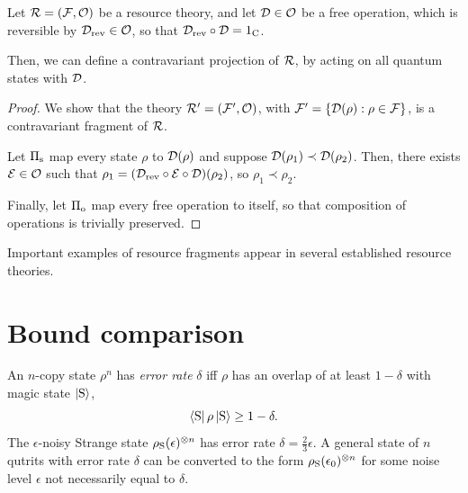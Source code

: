 \documentclass[pra,
aps,
twocolumn,
superscriptaddress,
groupedaddress,
nofootinbib,
reprint
]{revtex4-1}
\begin{document}
\begin{proposition}
	Let $\mathcal{R} = (\mathcal{F},\mathcal{O})$ be a resource theory, and let $\mathcal{D} \in \mathcal{O}$ be a free operation, which is reversible by $\mathcal{D}_{\rm{rev}} \in \mathcal{O}$, so that $\mathcal{D}_{\rm{rev}} \circ \mathcal{D} = 1_{\rm{C}}$.
	
	Then, we can define a contravariant projection of $\mathcal{R}$, by acting on all quantum states with $\mathcal{D}$.
\end{proposition}
\begin{proof}
	We show that the theory $\mathcal{R}' = (\mathcal{F}', \mathcal{O})$, with $\mathcal{F}' = \{\mathcal{D}(\rho):\rho \in \mathcal{F} \}$, is a contravariant fragment of $\mathcal{R}$.
	
	Let $\Pi_{\rm{s}}$ map every state $\rho$ to $\mathcal{D}(\rho)$ and suppose $\mathcal{D}(\rho_1) \prec \mathcal{D}(\rho_2)$. 
	Then, there exists $\mathcal{E} \in \mathcal{O}$ such that $\rho_1 = (\mathcal{D}_{\rm{rev}} \circ \mathcal{E} \circ \mathcal{D}) (\rho_2)$, so $\rho_1 \prec \rho_2$.
	
	Finally, let $\Pi_{\rm{o}}$ map every free operation to itself, so that composition of operations is trivially preserved.
	
 
\end{proof}

Important examples of resource fragments appear in several established resource theories.  


\section{Bound comparison}
An $n$-copy state $\rho^n$ has \emph{error rate} $\delta$ iff $\rho$ has an overlap of at least $1-\delta$ with magic state $\ket{\rm{S}}$,
\begin{equation}
	\bra{\rm{S}}\rho\ket{\rm{S}} \geq 1-\delta.
\end{equation}
The $\epsilon$-noisy Strange state $\rho_{\rm{S}}(\epsilon)^{\otimes n}$ has error rate $\delta = \frac{2}{3}\epsilon$.
A general state of $n$ qutrits with error rate $\delta$ can be converted to the form $\rho_{\rm{S}}(\epsilon_0)^{\otimes n}$ for some noise level $\epsilon$ not necessarily equal to $\delta$.
\end{document}

